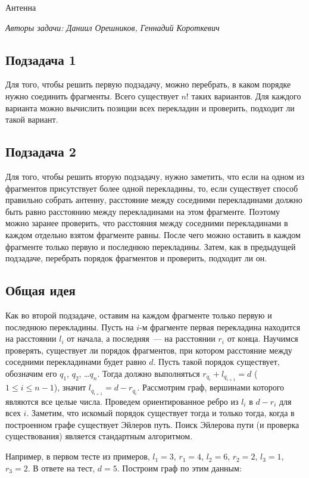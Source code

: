 \begin{tutorial}{Антенна}

\medskip
\textit{Авторы задачи: Даниил Орешников, Геннадий Короткевич}
\medskip

\subsection*{Подзадача 1}
Для того, чтобы решить первую подзадачу, можно перебрать, в каком порядке нужно соединить фрагменты. Всего существует $n!$ таких вариантов. Для каждого варианта можно вычислить позиции всех перекладин и проверить, подходит ли такой вариант.

\subsection*{Подзадача 2}
Для того, чтобы решить вторую подзадачу, нужно заметить, что если на одном из фрагментов присутствует более одной перекладины, то, если существует способ правильно собрать антенну, расстояние между соседними перекладинами должно быть равно расстоянию между перекладинами на этом фрагменте. Поэтому можно заранее проверить, что расстояния между соседними перекладинами в каждом отдельно взятом фрагменте равны. После чего можно оставить в каждом фрагменте только первую и последнюю перекладины. Затем, как в предыдущей подзадаче, перебрать порядок фрагментов и проверить, подходит ли он.

\subsection*{Общая идея}
Как во второй подзадаче, оставим на каждом фрагменте только первую и последнюю перекладины. Пусть на $i$-м фрагменте первая перекладина находится на расстоянии $l_i$ от начала, а последняя~--- на расстоянии $r_i$ от конца. Научимся проверять, существует ли порядок фрагментов, при котором расстояние между соседними перекладинами будет равно $d$. Пусть такой порядок существует, обозначим его $q_1$, $q_2$, \dots $q_n$. Тогда должно выполняться $r_{q_i} + l_{q_{i + 1}} = d$ ($1 \le i \le n - 1$), значит $l_{q_{i + 1}} = d - r_{q_i}$. Рассмотрим граф, вершинами которого являются все целые числа. Проведем ориентированное ребро из $l_{i}$ в $d - r_{i}$ для всех $i$. Заметим, что искомый порядок существует тогда и только тогда, когда в построенном графе существует Эйлеров путь. Поиск Эйлерова пути (и проверка существования) является стандартным алгоритмом.

Например, в первом тесте из примеров, $l_1 = 3$, $r_1 = 4$, $l_2 = 6$, $r_2 = 2$, $l_3 = 1$, $r_3 = 2$. В ответе на тест, $d = 5$. Построим граф по этим данным:


\end{tutorial}
